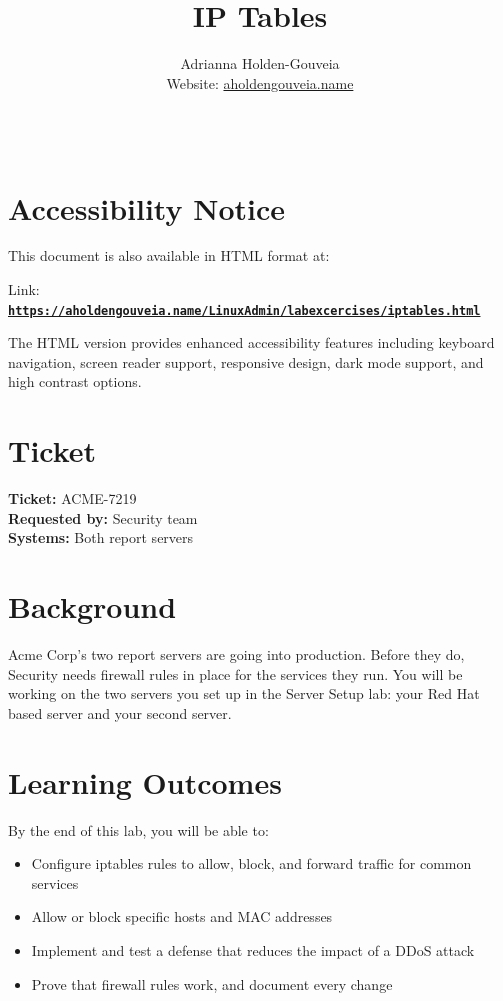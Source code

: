 \documentclass[12pt]{article}
\title{IP Tables}
\author{
        Adrianna Holden-Gouveia \\
        Website: \href{https://aholdengouveia.name}{aholdengouveia.name}\\ 
        \date{\vspace{-5ex}}
        \faGithub {: aholdengouveia} \\
        }
\begin{document}
    

\maketitle



\section*{Accessibility Notice}
This document is also available in HTML format at:

Link: \href{https://aholdengouveia.name/LinuxAdmin/labexcercises/iptables.html}{\textbf{\nolinkurl{https://aholdengouveia.name/LinuxAdmin/labexcercises/iptables.html}}}

The HTML version provides enhanced accessibility features including keyboard navigation, screen reader support, responsive design, dark mode support, and high contrast options.


\section*{Ticket}
\noindent\textbf{Ticket:} ACME-7219\\
\textbf{Requested by:} Security team\\
\textbf{Systems:} Both report servers

\section*{Background}
Acme Corp's two report servers are going into production. Before they do, Security needs firewall rules in place for the services they run. You will be working on the two servers you set up in the Server Setup lab: your Red Hat based server and your second server.

\section*{Learning Outcomes}
By the end of this lab, you will be able to:
\begin{itemize}
    \item Configure iptables rules to allow, block, and forward traffic for common services
    \item Allow or block specific hosts and MAC addresses
    \item Implement and test a defense that reduces the impact of a DDoS attack
    \item Prove that firewall rules work, and document every change
\end{itemize}
\end{document}
